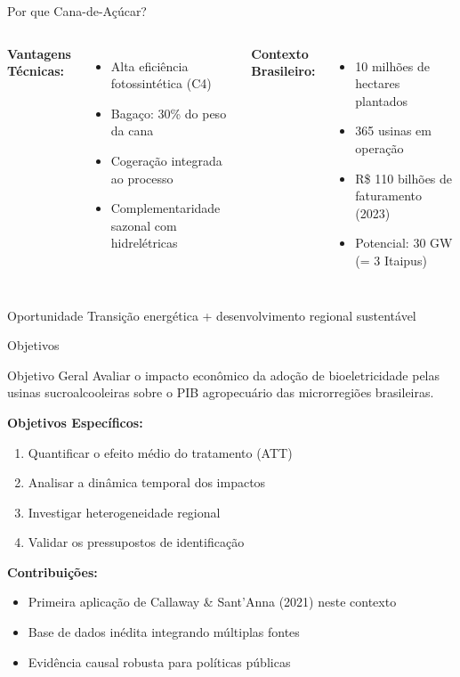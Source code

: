 \documentclass[10pt,aspectratio=169]{beamer}
\begin{document}
\begin{frame}{Por que Cana-de-Açúcar?}
\begin{columns}
\textbf{Vantagens Técnicas:}
\begin{itemize}
    \item Alta eficiência fotossintética (C4)
    \item Bagaço: 30\% do peso da cana
    \item Cogeração integrada ao processo
    \item Complementaridade sazonal com hidrelétricas
\end{itemize}

\textbf{Contexto Brasileiro:}
\begin{itemize}
    \item 10 milhões de hectares plantados
    \item 365 usinas em operação
    \item R\$ 110 bilhões de faturamento (2023)
    \item Potencial: 30 GW (= 3 Itaipus)
\end{itemize}
\end{columns}

\begin{alertblock}{Oportunidade}
Transição energética + desenvolvimento regional sustentável
\end{alertblock}
\end{frame}

\begin{frame}{Objetivos}
\begin{block}{Objetivo Geral}
Avaliar o impacto econômico da adoção de bioeletricidade pelas usinas sucroalcooleiras sobre o PIB agropecuário das microrregiões brasileiras.
\end{block}

\textbf{Objetivos Específicos:}
\begin{enumerate}
    \item Quantificar o efeito médio do tratamento (ATT)
    \item Analisar a dinâmica temporal dos impactos
    \item Investigar heterogeneidade regional
    \item Validar os pressupostos de identificação
\end{enumerate}

\textbf{Contribuições:}
\begin{itemize}
    \item Primeira aplicação de Callaway \& Sant'Anna (2021) neste contexto
    \item Base de dados inédita integrando múltiplas fontes
    \item Evidência causal robusta para políticas públicas
\end{itemize}
\end{frame}
\end{document}
